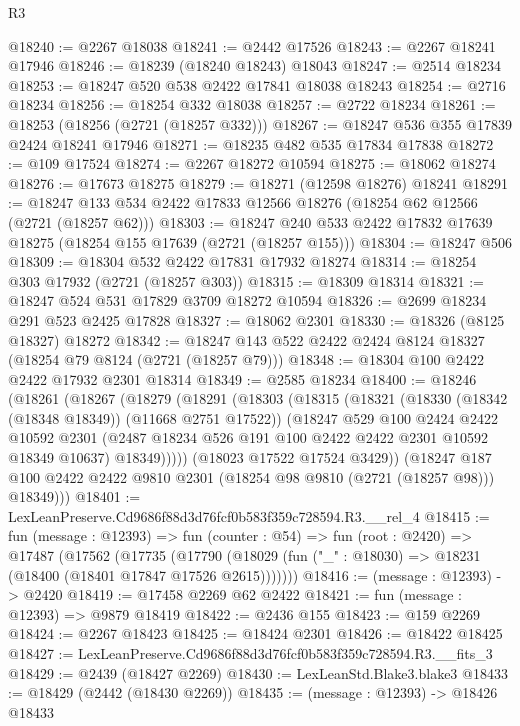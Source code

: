 \begin{lexlean}{R3}
\begin{coremodule}
@18240 := @2267 @18038
@18241 := @2442 @17526
@18243 := @2267 @18241 @17946
@18246 := @18239 (@18240 @18243) @18043
@18247 := @2514 @18234
@18253 := @18247 @520 @538 @2422 @17841 @18038 @18243
@18254 := @2716 @18234
@18256 := @18254 @332 @18038
@18257 := @2722 @18234
@18261 := @18253 (@18256 (@2721 (@18257 @332)))
@18267 := @18247 @536 @355 @17839 @2424 @18241 @17946
@18271 := @18235 @482 @535 @17834 @17838
@18272 := @109 @17524
@18274 := @2267 @18272 @10594
@18275 := @18062 @18274
@18276 := @17673 @18275
@18279 := @18271 (@12598 @18276) @18241
@18291 := @18247 @133 @534 @2422 @17833 @12566 @18276 (@18254 @62 @12566 (@2721 (@18257 @62)))
@18303 := @18247 @240 @533 @2422 @17832 @17639 @18275 (@18254 @155 @17639 (@2721 (@18257 @155)))
@18304 := @18247 @506
@18309 := @18304 @532 @2422 @17831 @17932 @18274
@18314 := @18254 @303 @17932 (@2721 (@18257 @303))
@18315 := @18309 @18314
@18321 := @18247 @524 @531 @17829 @3709 @18272 @10594
@18326 := @2699 @18234 @291 @523 @2425 @17828
@18327 := @18062 @2301
@18330 := @18326 (@8125 @18327) @18272
@18342 := @18247 @143 @522 @2422 @2424 @8124 @18327 (@18254 @79 @8124 (@2721 (@18257 @79)))
@18348 := @18304 @100 @2422 @2422 @17932 @2301 @18314
@18349 := @2585 @18234
@18400 := @18246
    (@18261
      (@18267
        (@18279
          (@18291
            (@18303
              (@18315
                (@18321
                  (@18330 (@18342 (@18348 @18349)) (@11668 @2751 @17522))
                  (@18247
                    @529
                    @100
                    @2424
                    @2422
                    @10592
                    @2301
                    (@2487 @18234 @526 @191 @100 @2422 @2422 @2301 @10592 @18349 @10637)
                    @18349)))))
          (@18023 @17522 @17524 @3429))
        (@18247 @187 @100 @2422 @2422 @9810 @2301 (@18254 @98 @9810 (@2721 (@18257 @98))) @18349)))
@18401 := LexLeanPreserve.Cd9686f88d3d76fcf0b583f359c728594.R3.__rel_4
@18415 := fun (message : @12393) =>
  fun (counter : @54) =>
  fun (root : @2420) =>
  @17487
    (@17562
      (@17735
        (@17790 (@18029 (fun ("_" : @18030) => @18231 (@18400 (@18401 @17847 @17526 @2615)))))))
@18416 := (message : @12393) -> @2420
@18419 := @17458 @2269 @62 @2422
@18421 := fun (message : @12393) => @9879 @18419
@18422 := @2436 @155
@18423 := @159 @2269
@18424 := @2267 @18423
@18425 := @18424 @2301
@18426 := @18422 @18425
@18427 := LexLeanPreserve.Cd9686f88d3d76fcf0b583f359c728594.R3.__fits_3
@18429 := @2439 (@18427 @2269)
@18430 := LexLeanStd.Blake3.blake3
@18433 := @18429 (@2442 (@18430 @2269))
@18435 := (message : @12393) -> @18426 @18433

\end{coremodule}
\end{lexlean}
